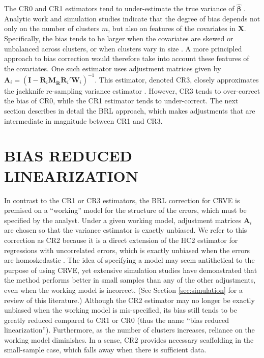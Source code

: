 \documentclass[12pt]{article}\usepackage[]{graphicx}\usepackage[]{color}
\newcommand{\bm}{\mathbf}
\newcommand{\bs}{\boldsymbol}
\begin{document}
The CR0 and CR1 estimators tend to under-estimate the true variance of $\hat{\bs\beta}$ \citep{Cameron2015practitioners}. Analytic work and simulation studies indicate that the degree of bias depends not only on the number of clusters $m$, but also on features of the covariates in $\bm{X}$. Specifically, 
the bias tends to be larger when the covariates are skewed or unbalanced across clusters, or when clusters vary in size \citep{Carter2013asymptotic, MacKinnon2013thirty}. 
A more principled approach to bias correction would therefore take into account these features of the covariates. 
One such estimator uses adjustment matrices given by $\bm{A}_i = \left(\bm{I} - \bm{\ddot{R}}_i \bm{M_{\ddot{R}}}\bm{\ddot{R}}_i'\bm{W}_i\right)^{-1}$. This estimator, denoted CR3, closely approximates the jackknife re-sampling variance estimator \citep{Bell2002bias, Mancl2001covariance}.  
However, CR3 tends to over-correct the bias of CR0, while the CR1 estimator tends to under-correct. 
The next section describes in detail the BRL approach, which makes adjustments that are intermediate in magnitude between CR1 and CR3. 


\section{BIAS REDUCED LINEARIZATION}
\label{sec:BRL}

In contrast to the CR1 or CR3 estimators, the BRL correction for CRVE is premised on a ``working'' model for the structure of the errors, which must be specified by the analyst. 
Under a given working model, adjustment matrices $\bm{A}_i$ are chosen so that the variance estimator is exactly unbiased.
We refer to this correction as CR2 because it is a direct extension of the HC2 estimator for regressions with uncorrelated errors, which is exactly unbiased when the errors are homoskedastic \citep{MacKinnon1985some}.
The idea of specifying a model may seem antithetical to the purpose of using CRVE, yet extensive simulation studies have demonstrated that the method performs better in small samples than any of the other adjustments, even when the working model is incorrect. (See Section \ref{sec:simulation} for a review of this literature.) 
Although the CR2 estimator may no longer be exactly unbiased when the working model is mis-specified, its bias still tends to be greatly reduced compared to CR1 or CR0 (thus the name ``bias reduced linearization''). Furthermore, as the number of clusters increases, reliance on the working model diminishes. 
In a sense, CR2 provides necessary scaffolding in the small-sample case, which falls away when there is sufficient data.
\end{document}
